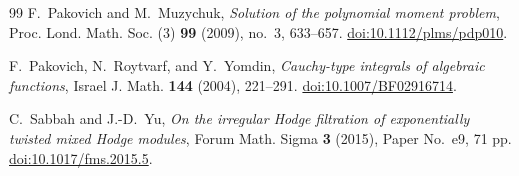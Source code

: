 \documentclass[11pt]{article}
\numberwithin{equation}{section}
\theoremstyle{definition}
\theoremstyle{remark}
\begin{document}
\begin{thebibliography}{99}
F.~Pakovich and M.~Muzychuk,
\emph{Solution of the polynomial moment problem},
Proc. Lond. Math. Soc. (3) \textbf{99} (2009), no.~3, 633--657.
\href{https://doi.org/10.1112/plms/pdp010}{doi:10.1112/plms/pdp010}.

F.~Pakovich, N.~Roytvarf, and Y.~Yomdin,
\emph{Cauchy-type integrals of algebraic functions},
Israel J. Math. \textbf{144} (2004), 221--291.
\href{https://doi.org/10.1007/BF02916714}{doi:10.1007/BF02916714}.

C.~Sabbah and J.-D.~Yu,
\emph{On the irregular Hodge filtration of exponentially twisted mixed
Hodge modules},
Forum Math. Sigma \textbf{3} (2015), Paper No.~e9, 71 pp.
\href{https://doi.org/10.1017/fms.2015.5}{doi:10.1017/fms.2015.5}.

\end{thebibliography}
\end{document}
